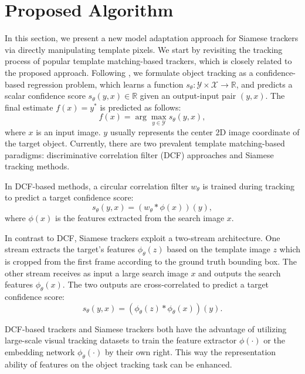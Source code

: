\section{Proposed Algorithm}
In this section, we present a new model adaptation approach for Siamese trackers via directly manipulating template pixels. We start by revisiting the tracking process of popular template matching-based trackers, which is closely related to the proposed approach. Following \cite{Danelljan_2020_CVPR}, we formulate object tracking as a confidence-based regression problem, which learns a function $s_\theta:\mathcal{Y\times X\rightarrow \mathbb R}$, and predicts a scalar confidence score $s_\theta(y,x)\in\mathbb R$ given an output-input pair $(y,x)$. The final estimate $f(x)=y^*$ is predicted as follows:
\begin{equation}
    f(x) = \arg\max_{y\in \mathcal Y}s_\theta (y,x),
\end{equation}
where $x$ is an input image. $y$ usually represents the center 2D image coordinate of the target object. Currently, there are two prevalent template matching-based paradigms: discriminative correlation filter (DCF) approaches and Siamese tracking methods.

In DCF-based methods, a circular correlation filter $w_{\theta}$ is trained during tracking to predict a target confidence score:
\begin{equation}
    s_\theta(y,x)=(w_\theta * \phi(x))(y),
    \label{equ:dcf}
\end{equation}
where $\phi(x)$ is the features extracted from the search image $x$.

In contrast to DCF, Siamese trackers exploit a two-stream architecture. One stream extracts the target’s features $\phi_\theta(z)$ based on the template image $z$ which is cropped from the first frame according to the ground truth bounding box. The other stream receives as input a large search image $x$ and outputs the search features $\phi_\theta(x)$. The two outputs are cross-correlated to predict a target confidence score:
\begin{equation}
    s_\theta(y,x)=(\phi_\theta(z) * \phi_\theta(x))(y).
    \label{equ:siamese}
\end{equation}

DCF-based trackers and Siamese trackers both have the advantage of utilizing large-scale visual tracking datasets to train the feature extractor $\phi(\cdot)$ or the embedding network $\phi_{\theta}(\cdot)$ by their own right. This way the representation ability of features on the object tracking task can be enhanced. 

